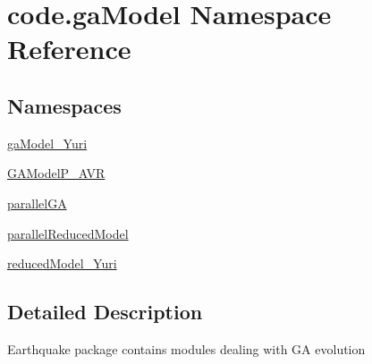 \hypertarget{namespacecode_1_1ga_model}{}\section{code.\+ga\+Model Namespace Reference}
\label{namespacecode_1_1ga_model}
\subsection*{Namespaces}
\begin{DoxyCompactItemize}
\item 
 \hyperlink{namespacecode_1_1ga_model_1_1ga_model___yuri}{ga\+Model\+\_\+\+Yuri}
\item 
 \hyperlink{namespacecode_1_1ga_model_1_1_g_a_model_p___a_v_r}{G\+A\+Model\+P\+\_\+\+A\+VR}
\item 
 \hyperlink{namespacecode_1_1ga_model_1_1parallel_g_a}{parallel\+GA}
\item 
 \hyperlink{namespacecode_1_1ga_model_1_1parallel_reduced_model}{parallel\+Reduced\+Model}
\item 
 \hyperlink{namespacecode_1_1ga_model_1_1reduced_model___yuri}{reduced\+Model\+\_\+\+Yuri}
\end{DoxyCompactItemize}


\subsection{Detailed Description}
\begin{DoxyVerb}Earthquake package contains modules dealing with GA evolution 
\end{DoxyVerb}
 